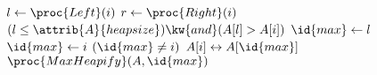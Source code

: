 \begin{codebox}
\li $l \gets \proc{Left}(i)$
\li $r \gets \proc{Right}(i)$
\li \If $(l \leq \attrib{A}{heapsize}) \kw{ and } (A[l] > A[i])$
\li 	\Then
			$\id{max} \gets l$
		\Else 
\li			$\id{max} \gets i$			
		\End
\li \If $(\id{max} \neq i)$
\li 	\Then 
			$A[i] \leftrightarrow A[\id{max}]$
\li			$\proc{MaxHeapify}(A,\id{max})$
\end{codebox}